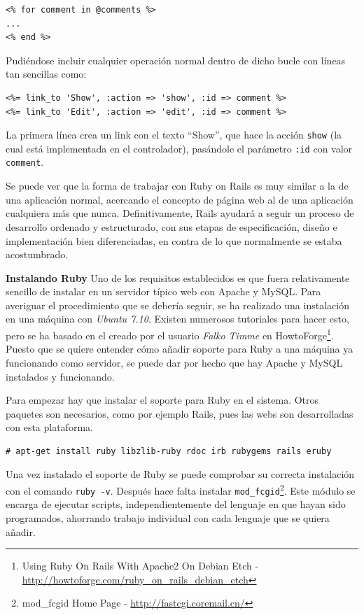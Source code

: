 \begin{verbatim}
<% for comment in @comments %>
...
<% end %>
\end{verbatim}

Pudiéndose incluir cualquier operación normal dentro de dicho bucle con líneas tan sencillas como:

\begin{verbatim}
<%= link_to 'Show', :action => 'show', :id => comment %>
<%= link_to 'Edit', :action => 'edit', :id => comment %>
\end{verbatim}

La primera línea crea un link con el texto ``Show'', que hace la acción \texttt{show} (la cual está implementada en el controlador), pasándole el parámetro \texttt{:id} con valor \texttt{comment}. 

Se puede ver que la forma de trabajar con Ruby on Rails es muy similar a la de una aplicación normal, acercando el concepto de página web al de una aplicación cualquiera más que nunca. Definitivamente, Rails ayudará a seguir un proceso de desarrollo ordenado y estructurado, con sus etapas de especificación, diseño e implementación bien diferenciadas, en contra de lo que normalmente se estaba acostumbrado.

\textbf{Instalando Ruby}
Uno de los requisitos establecidos es que fuera relativamente sencillo de instalar en un servidor típico web con Apache y MySQL. Para averiguar el procedimiento que se debería seguir, se ha realizado una instalación en una máquina con \emph{Ubuntu 7.10}. Existen numerosos tutoriales para hacer esto, pero se ha basado en el creado por el usuario \emph{Falko Timme} en HowtoForge\footnote{Using Ruby On Rails With Apache2 On Debian Etch - \url{http://howtoforge.com/ruby_on_rails_debian_etch}}. Puesto que se quiere entender cómo añadir soporte para Ruby a una máquina ya funcionando como servidor, se puede dar por hecho que hay Apache y MySQL instalados y funcionando.

Para empezar hay que instalar el soporte para Ruby en el sistema. Otros paquetes son necesarios, como por ejemplo Rails, pues las webs son desarrolladas con esta plataforma.

\begin{verbatim}
# apt-get install ruby libzlib-ruby rdoc irb rubygems rails eruby
\end{verbatim}

Una vez instalado el soporte de Ruby se puede comprobar su correcta instalación con el comando \texttt{ruby -v}. Después hace falta instalar \texttt{mod\_fcgid}\footnote{mod\_fcgid Home Page - \url{http://fastcgi.coremail.cn/}}. Este módulo se encarga de ejecutar scripts, independientemente del lenguaje en que hayan sido programados, ahorrando trabajo individual con cada lenguaje que se quiera añadir.

